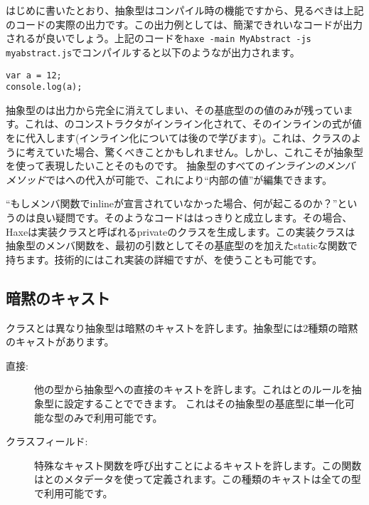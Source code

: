 
はじめに書いたとおり、抽象型はコンパイル時の機能ですから、見るべきは上記のコードの実際の出力です。この出力例としては、簡潔できれいなコードが出力されるが良いでしょう。上記のコードを\texttt{haxe -main MyAbstract -js myabstract.js}でコンパイルすると以下のようなが出力されます。

\begin{lstlisting}
var a = 12;
console.log(a);
\end{lstlisting}

抽象型のは出力から完全に消えてしまい、その基底型のの値のみが残っています。これは、のコンストラクタがインライン化されて、そのインラインの式が値をに代入します(インライン化については後ので学びます)。これは、クラスのように考えていた場合、驚くべきことかもしれません。しかし、これこそが抽象型を使って表現したいことそのものです。
抽象型のすべての\emph{インラインのメンバメソッド}ではへの代入が可能で、これにより``内部の値''が編集できます。

``もしメンバ関数でinlineが宣言されていなかった場合、何が起こるのか？''というのは良い疑問です。そのようなコードははっきりと成立します。その場合、Haxeは実装クラスと呼ばれるprivateのクラスを生成します。この実装クラスは抽象型のメンバ関数を、最初の引数としてその基底型のを加えたstaticな関数で持ちます。技術的にはこれ実装の詳細ですが、を使うことも可能です。




\subsection{暗黙のキャスト}
\label{types-abstract-implicit-casts}

クラスとは異なり抽象型は暗黙のキャストを許します。抽象型には2種類の暗黙のキャストがあります。

\begin{description}
	\item[直接:] 他の型から抽象型への直接のキャストを許します。これはとのルールを抽象型に設定することでできます。 これはその抽象型の基底型に単一化可能な型のみで利用可能です。
	\item[クラスフィールド:] 特殊なキャスト関数を呼び出すことによるキャストを許します。この関数はとのメタデータを使って定義されます。この種類のキャストは全ての型で利用可能です。
\end{description}

